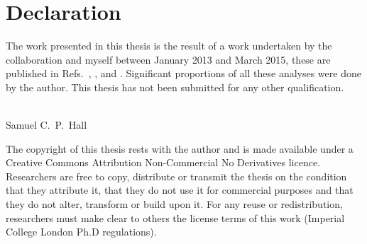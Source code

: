 \clearpage
\chapter*{\centering Declaration}

\begin{center}
  {\setlength{\currentparskip}{\parskip}%
  \begin{minipage}{0.8\textwidth}
    \setlength{\parskip}{\currentparskip}%
    The work presented in this thesis is the result of a work undertaken by the
    \lhcb collaboration and myself between January 2013 and March 2015, these are
    published in Refs.~\cite{LHCb-PAPER-2012-025}, \cite{LHCb-PAPER-2014-030}, and \cite{DB}.
    Significant proportions of all these analyses were done by the author.
    This thesis has not been submitted for any other qualification.
    \\\\
    \begin{flushright}
      Samuel C.~P.~Hall\\
      \shortdate
    \end{flushright}
  \end{minipage}

    \vfill

  \begin{minipage}{0.8\textwidth}
    \footnotesize
    The copyright of this thesis rests with the author and is made available under a Creative
    Commons Attribution Non-Commercial No Derivatives licence. Researchers are free to copy,
    distribute or transmit the thesis on the condition that they attribute it, that they do not use
    it for commercial purposes and that they do not alter, transform or build upon it. For any
    reuse or redistribution, researchers must make clear to others the license terms of this work
    (Imperial College London Ph.D regulations).
  \end{minipage}}
  \vspace{1.0cm}
\end{center}
